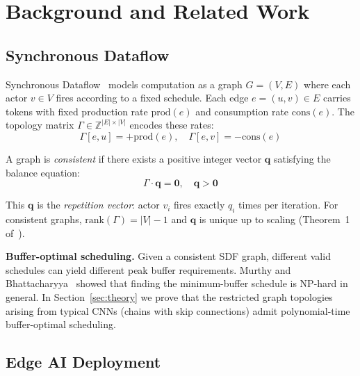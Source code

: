 \documentclass[journal]{IEEEtran}
\begin{document}
\section{Background and Related Work}

\subsection{Synchronous Dataflow}

Synchronous Dataflow~\cite{lee1987sdf} models computation as a graph $G = (V, E)$ where each actor $v \in V$ fires according to a fixed schedule.
Each edge $e = (u, v) \in E$ carries tokens with fixed production rate $\mathrm{prod}(e)$ and consumption rate $\mathrm{cons}(e)$.
The topology matrix $\Gamma \in \mathbb{Z}^{|E| \times |V|}$ encodes these rates:
\begin{equation}
\Gamma[e, u] = +\mathrm{prod}(e), \quad \Gamma[e, v] = -\mathrm{cons}(e)
\label{eq:topology}
\end{equation}

A graph is \emph{consistent} if there exists a positive integer vector $\mathbf{q}$ satisfying the balance equation:
\begin{equation}
\Gamma \cdot \mathbf{q} = \mathbf{0}, \quad \mathbf{q} > \mathbf{0}
\label{eq:balance}
\end{equation}

This $\mathbf{q}$ is the \emph{repetition vector}: actor $v_i$ fires exactly $q_i$ times per iteration.
For consistent graphs, $\mathrm{rank}(\Gamma) = |V| - 1$ and $\mathbf{q}$ is unique up to scaling (Theorem~1 of~\cite{lee1987sdf}).

\textbf{Buffer-optimal scheduling.}
Given a consistent SDF graph, different valid schedules can yield different peak buffer requirements.
Murthy and Bhattacharyya~\cite{murthy2004buffer} showed that finding the minimum-buffer schedule is NP-hard in general.
In Section~\ref{sec:theory} we prove that the restricted graph topologies arising from typical CNNs (chains with skip connections) admit polynomial-time buffer-optimal scheduling.

\subsection{Edge AI Deployment}
\end{document}
